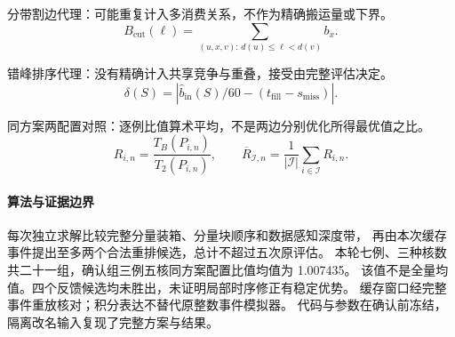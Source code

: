 分带割边代理：可能重复计入多消费关系，不作为精确搬运量或下界。
\[
B_{\mathrm{cut}}(\ell)=
\sum_{(u,x,v):\,d(u)\le\ell<d(v)}b_x. \tag{11}
\]

错峰排序代理：没有精确计入共享竞争与重叠，接受由完整评估决定。
\[
\delta(S)=\left|\widehat b_{\mathrm{in}}(S)/60-
(t_{\mathrm{fill}}-s_{\mathrm{miss}})\right|. \tag{12}
\]

同方案两配置对照：逐例比值算术平均，不是两边分别优化所得最优值之比。
\[
R_{i,n}=\frac{T_B(P_{i,n})}{T_2(P_{i,n})},\qquad
\overline R_{\mathcal I,n}=\frac1{|\mathcal I|}\sum_{i\in\mathcal I}R_{i,n}. \tag{13}
\]

\paragraph{算法与证据边界}
每次独立求解比较完整分量装箱、分量块顺序和数据感知深度带，
再由本次缓存事件提出至多两个合法重排候选，总计不超过五次原评估。
本轮七例、三种核数共二十一组，确认组三例五核同方案配置比值均值为 1.007435。
该值不是全量均值。四个反馈候选均未胜出，未证明局部时序修正有稳定优势。
缓存窗口经完整事件重放核对；积分表达不替代原整数事件模拟器。
代码与参数在确认前冻结，隔离改名输入复现了完整方案与结果。
